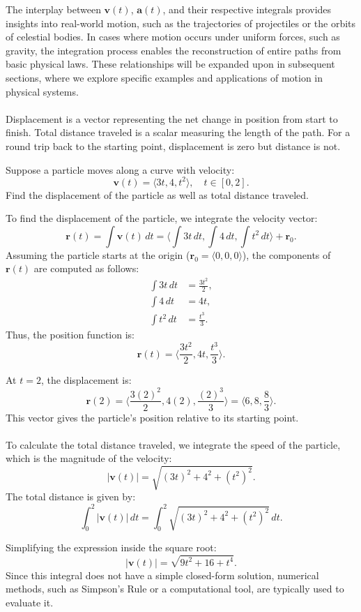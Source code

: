 \noindent The interplay between \( \mathbf{v}(t) \), \( \mathbf{a}(t) \), and their respective integrals provides insights into real-world motion, such as the trajectories of projectiles or the orbits of celestial bodies. In cases where motion occurs under uniform forces, such as gravity, the integration process enables the reconstruction of entire paths from basic physical laws. These relationships will be expanded upon in subsequent sections, where we explore specific examples and applications of motion in physical systems.\\ \\
\noindent Displacement is a vector representing the net change in position from start to finish. Total distance traveled is a scalar measuring the length of the path. For a round trip back to the starting point, displacement is zero but distance is not.

\exampleline
\begin{example}
Suppose a particle moves along a curve with velocity:
\[
\mathbf{v}(t) = \langle 3t, 4, t^2 \rangle, \quad t \in [0, 2].
\]
Find the displacement of the particle as well as total distance traveled.
\begin{solution}
To find the displacement of the particle, we integrate the velocity vector:
\[
\mathbf{r}(t) = \int \mathbf{v}(t) \, dt = \langle \int 3t \, dt, \int 4 \, dt, \int t^2 \, dt \rangle + \mathbf{r}_0.
\]
Assuming the particle starts at the origin (\( \mathbf{r}_0 = \langle 0, 0, 0 \rangle \)), the components of \( \mathbf{r}(t) \) are computed as follows:
\begin{align*}
    \int 3t \, dt &= \frac{3t^2}{2}, \\
    \int 4 \, dt &= 4t, \\
    \int t^2 \, dt &= \frac{t^3}{3}.
\end{align*}
Thus, the position function is:
\[
\mathbf{r}(t) = \langle \frac{3t^2}{2}, 4t, \frac{t^3}{3} \rangle.
\]

\noindent At \( t = 2 \), the displacement is:
\[
\mathbf{r}(2) = \langle \frac{3(2)^2}{2}, 4(2), \frac{(2)^3}{3} \rangle = \langle 6, 8, \frac{8}{3} \rangle.
\]
This vector gives the particle’s position relative to its starting point. \\ \\ To calculate the total distance traveled, we integrate the speed of the particle, which is the magnitude of the velocity:
\[
|\mathbf{v}(t)| = \sqrt{(3t)^2 + 4^2 + (t^2)^2}.
\]
The total distance is given by:
\[
\int_{0}^{2} |\mathbf{v}(t)| \, dt = \int_{0}^{2} \sqrt{(3t)^2 + 4^2 + (t^2)^2} \, dt.
\]

\noindent Simplifying the expression inside the square root:
\[
|\mathbf{v}(t)| = \sqrt{9t^2 + 16 + t^4}.
\]
Since this integral does not have a simple closed-form solution, numerical methods, such as Simpson's Rule or a computational tool, are typically used to evaluate it.
\end{solution}
\end{example}
\exampleline

